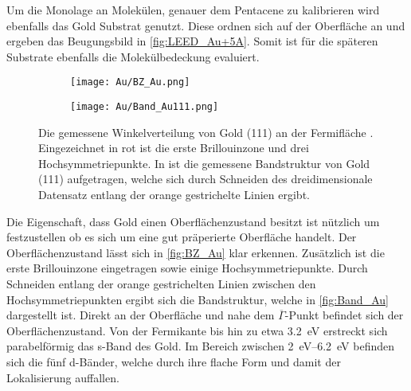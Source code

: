         Um die Monolage an Molekülen, genauer dem Pentacene zu kalibrieren wird ebenfalls das Gold Substrat genutzt.
        Diese ordnen sich auf der Oberfläche an und ergeben das Beugungsbild in \autoref{fig:LEED_Au+5A}.
        Somit ist für die späteren Substrate ebenfalls die Molekülbedeckung evaluiert.

        \begin{figure}
            \centering
            \begin{subfigure}[t]{0.34\textwidth}
                \centering
                \texttt{[image: Au/BZ\_Au.png]}
                \subcaption{}
                \label{fig:BZ_Au}
            \end{subfigure}
            \begin{subfigure}[t]{0.62\textwidth}
                \centering
                \texttt{[image: Au/Band\_Au111.png]}
                \subcaption{}
                \label{fig:Band_Au}
            \end{subfigure}
            \caption{Die gemessene Winkelverteilung von Gold (111) an der Fermifläche .
            Eingezeichnet in rot ist die erste Brillouinzone und drei Hochsymmetriepunkte.
            In  ist die gemessene Bandstruktur von Gold (111) aufgetragen, welche sich durch Schneiden des dreidimensionale Datensatz entlang der orange gestrichelte Linien ergibt.}
        \end{figure}
        Die Eigenschaft, dass Gold einen Oberflächenzustand besitzt ist nützlich um festzustellen ob es sich um eine gut präperierte Oberfläche handelt.
        Der Oberflächenzustand lässt sich in \autoref{fig:BZ_Au} klar erkennen.
        Zusätzlich ist die erste Brillouinzone eingetragen sowie einige Hochsymmetriepunkte.
        Durch Schneiden entlang der orange gestrichelten Linien zwischen den Hochsymmetriepunkten ergibt sich die Bandstruktur, welche in \autoref{fig:Band_Au} dargestellt ist.
        Direkt an der Oberfläche und nahe dem $\overline{\Gamma}$-Punkt befindet sich der Oberflächenzustand.
        Von der Fermikante bis hin zu etwa \SI{3.2}{\electronvolt} erstreckt sich parabelförmig das s-Band des Gold.
        Im Bereich zwischen \SIrange{2}{6.2}{\electronvolt} befinden sich die fünf d-Bänder, welche durch ihre flache Form und damit der Lokalisierung auffallen.

